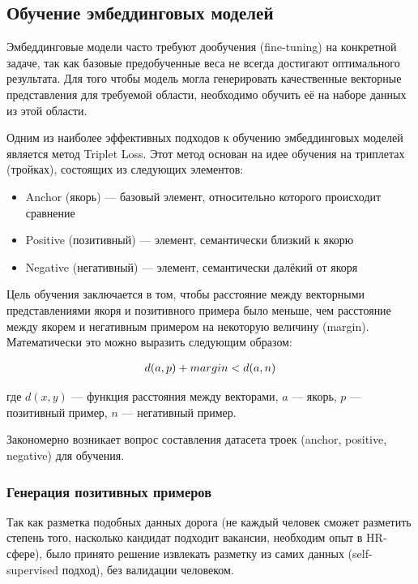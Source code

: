 \documentclass[14pt]{mmcs_article}
\begin{document}
\subsection{Обучение эмбеддинговых моделей}

Эмбеддинговые модели часто требуют дообучения (fine-tuning) на конкретной задаче, так как базовые предобученные веса не всегда достигают оптимального результата. Для того чтобы модель могла генерировать качественные векторные представления для требуемой области, необходимо обучить её на наборе данных из этой области.

Одним из наиболее эффективных подходов к обучению эмбеддинговых моделей является метод Triplet Loss. Этот метод основан на идее обучения на триплетах (тройках), состоящих из следующих элементов:
\begin{itemize}
  \item Anchor (якорь) --- базовый элемент, относительно которого происходит сравнение
  \item Positive (позитивный) --- элемент, семантически близкий к якорю
  \item Negative (негативный) --- элемент, семантически далёкий от якоря
\end{itemize}

Цель обучения заключается в том, чтобы расстояние между векторными представлениями якоря и позитивного примера было меньше, чем расстояние между якорем и негативным примером на некоторую величину (margin). Математически это можно выразить следующим образом:

\begin{equation*}
  \centering
  \allowdisplaybreaks[1]
  \begin{split}
    d(a,p) + margin < d(a,n)
  \end{split}
\end{equation*}

где $d(x,y)$ --- функция расстояния между векторами, $a$ --- якорь, $p$ --- позитивный пример, $n$ --- негативный пример.

Закономерно возникает вопрос составления датасета троек (anchor, positive, negative) для обучения.

\subsubsection{Генерация позитивных примеров}\label{positive_examples_generation}

Так как разметка подобных данных дорога (не каждый человек сможет разметить степень того, насколько кандидат подходит вакансии, необходим опыт в HR-сфере), было принято решение извлекать разметку из самих данных (self-supervised подход), без валидации человеком.
\end{document}
